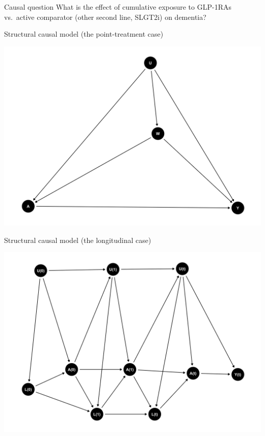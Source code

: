 \documentclass[
  ignorenonframetext,
  twocolumn]{beamer}
\begin{document}
\begin{frame}{Causal question}
\protect\hypertarget{causal-question}{}
What is the effect of cumulative exposure to GLP-1RAs vs.~active
comparator (other second line, SLGT2i) on dementia?
\end{frame}

\begin{frame}{Structural causal model (the point-treatment case)}
\protect\hypertarget{structural-causal-model-the-point-treatment-case}{}
\begin{center}\includegraphics[width=0.9\linewidth,height=0.8\textheight]{ggdag1} \end{center}
\end{frame}

\begin{frame}{Structural causal model (the longitudinal case)}
\protect\hypertarget{structural-causal-model-the-longitudinal-case}{}
\begin{center}\includegraphics[width=0.9\linewidth,height=0.8\textheight]{ggdag2} \end{center}
\end{frame}
\end{document}
